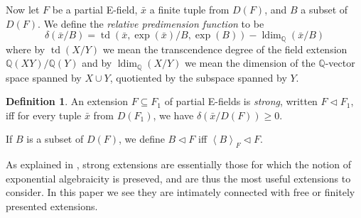 \documentclass[12pt]{amsart}
\theoremstyle{definition}
\newtheorem{defn}[prop]{Definition}
\begin{document}
Now let $F$ be a partial E-field, ${{\ensuremath{\bar{x}}}}$ a finite tuple from $D(F)$, and $B$ a subset of $D(F)$. We define the \emph{relative predimension function} to be
\[\delta({{\ensuremath{\bar{x}}}}/B) = \operatorname{td}({{\ensuremath{\bar{x}}}},\exp({{\ensuremath{\bar{x}}}})/B,\exp(B)) - \operatorname{ldim}_{\ensuremath{\mathbb{Q}}}({{\ensuremath{\bar{x}}}}/B)\]
where by $\operatorname{td}(X/Y)$ we mean the transcendence degree of the field extension ${\ensuremath{\mathbb{Q}}}(XY)/{\ensuremath{\mathbb{Q}}}(Y)$ and by $\operatorname{ldim}_{\ensuremath{\mathbb{Q}}}(X/Y)$ we mean the dimension of the ${\ensuremath{\mathbb{Q}}}$-vector space spanned by $X \cup Y$, quotiented by the subspace spanned by $Y$.
\begin{defn}
An extension $F {\subseteq} F_1$ of partial E-fields is \emph{strong}, written $F {\ensuremath{\lhd}}
F_1$, iff for every tuple ${{\ensuremath{\bar{x}}}}$ from $D(F_1)$, we have $\delta({{\ensuremath{\bar{x}}}}/D(F)) {\ensuremath{\geqslant}} 0$.
  
If $B$ is a subset of $D(F)$, we define $B {\ensuremath{\lhd}} F$ iff ${\ensuremath{\left\langle {B} \right\rangle}}_F {\ensuremath{\lhd}} F$.
\end{defn}

As explained in \cite{EAEF}, strong extensions are essentially those for which the notion of exponential algebraicity is preseved, and are thus the most useful extensions to consider. In this paper we see they are intimately connected with free or finitely presented extensions. 
\end{document}
